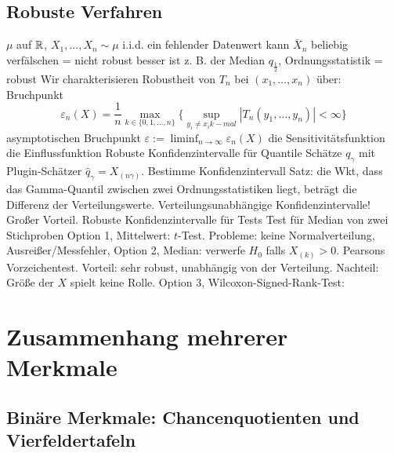 \subsection{Robuste Verfahren}

\begin{outline}
\0 $\mu$ auf $\mathbb{R}$, $X_1,...,X_n \sim \mu$ i.i.d.
    \1 ein fehlender Datenwert kann $\overline{X}_n$ beliebig verfälschen = nicht robust
    \1 besser ist z. B. der Median $q_\frac{1}{2}$, Ordnungsstatistik = robust
\0 Wir charakterisieren Robustheit von $T_n$ bei $(x_1,\ldots,x_n)$ über:
    \1 Bruchpunkt \[\varepsilon_n(X)=\frac{1}{n}\max_{k\in\{0,1,\ldots,n\}}\{\sup_{y_i\neq x_i k-mal} | T_n(y_1,\ldots,y_n)|<\infty\}\]
    \1 asymptotischen Bruchpunkt $\varepsilon := \liminf_{n\to\infty} \varepsilon_n(X)$
    \1 die Sensitivitätsfunktion
    \1 die Einflussfunktion
\0 Robuste Konfidenzintervalle für Quantile
    \1 Schätze $q_\gamma$ mit Plugin-Schätzer $\hat{q}_\gamma = X_{(n\gamma)}$. Bestimme Konfidenzintervall 
    \1 Satz: die Wkt, dass das Gamma-Quantil zwischen zwei Ordnungsstatistiken liegt, beträgt die Differenz der Verteilungswerte. 
        \2 Verteilungsunabhängige Konfidenzintervalle! Großer Vorteil.
\0 Robuste Konfidenzintervalle für Tests
    \1 Test für Median von zwei Stichproben
        \2 Option 1, Mittelwert: $t$-Test. Probleme: keine Normalverteilung, Ausreißer/Messfehler,
        \2 Option 2, Median: verwerfe $H_0$ falls $X_{(k)}>0$. Pearsons Vorzeichentest. Vorteil: sehr robust, unabhängig von der Verteilung. Nachteil: Größe der $X$ spielt keine Rolle.
        \2 Option 3, Wilcoxon-Signed-Rank-Test:
\end{outline}


\section{Zusammenhang mehrerer Merkmale}

\subsection{Binäre Merkmale: Chancenquotienten und Vierfeldertafeln}


